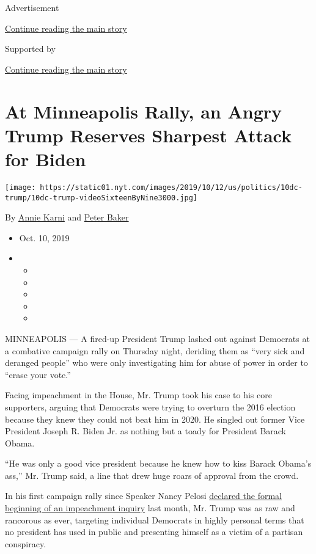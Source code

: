Advertisement

\protect\hyperlink{after-top}{Continue reading the main story}

Supported by

\protect\hyperlink{after-sponsor}{Continue reading the main story}

\hypertarget{at-minneapolis-rally-an-angry-trump-reserves-sharpest-attack-for-biden}{%
\section{At Minneapolis Rally, an Angry Trump Reserves Sharpest Attack
for
Biden}\label{at-minneapolis-rally-an-angry-trump-reserves-sharpest-attack-for-biden}}

\texttt{[image: https://static01.nyt.com/images/2019/10/12/us/politics/10dc-trump/10dc-trump-videoSixteenByNine3000.jpg]}

By \href{https://www.nytimes.com/by/annie-karni}{Annie Karni} and
\href{https://www.nytimes.com/by/peter-baker}{Peter Baker}

\begin{itemize}
\item
  Oct. 10, 2019
\item
  \begin{itemize}
  \item
  \item
  \item
  \item
  \item
  \end{itemize}
\end{itemize}

MINNEAPOLIS --- A fired-up President Trump lashed out against Democrats
at a combative campaign rally on Thursday night, deriding them as ``very
sick and deranged people'' who were only investigating him for abuse of
power in order to ``erase your vote.''

Facing impeachment in the House, Mr. Trump took his case to his core
supporters, arguing that Democrats were trying to overturn the 2016
election because they knew they could not beat him in 2020. He singled
out former Vice President Joseph R. Biden Jr. as nothing but a toady for
President Barack Obama.

``He was only a good vice president because he knew how to kiss Barack
Obama's ass,'' Mr. Trump said, a line that drew huge roars of approval
from the crowd.

In his first campaign rally since Speaker Nancy Pelosi
\href{https://www.nytimes.com/2019/09/24/us/politics/democrats-impeachment-trump.html}{declared
the formal beginning of an impeachment inquiry} last month, Mr. Trump
was as raw and rancorous as ever, targeting individual Democrats in
highly personal terms that no president has used in public and
presenting himself as a victim of a partisan conspiracy.

